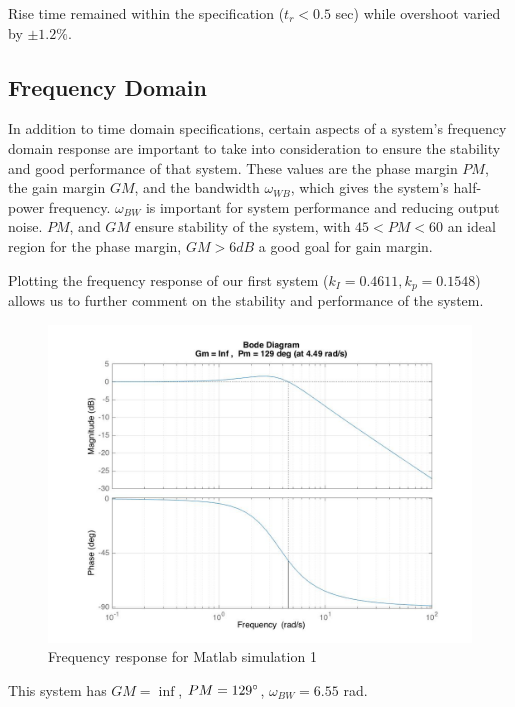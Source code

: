 \documentclass[11pt,titlepage]{article}
\begin{document}
	Rise time remained within the specification ($t_r<0.5$ sec) while overshoot varied by $\pm1.2\%$.
	
    \subsection{Frequency Domain}
    	In addition to time domain specifications, certain aspects of a system's frequency domain response are important to take into consideration to ensure the stability and good performance of that system. These values are the phase margin $PM$, the gain margin $GM$, and the bandwidth $\omega_{WB}$, which gives the system's half-power frequency. $\omega_{BW}$ is important for system performance and reducing output noise. $PM$, and $GM$ ensure stability of the system, with $45<PM<60$ an ideal region for the phase margin, $GM>6dB$ a good goal for gain margin. 
	
	Plotting the frequency response of our first system ($k_I=0.4611, k_p=0.1548$) allows us to further comment on the stability and performance of the system. 
	\begin{figure}[H]
        \centering
        \includegraphics[scale=.3]{Hyr_freq1_bode}
        \caption{Frequency response for Matlab simulation 1}
        \label{fig:Hyr_freq1_bode}
    \end{figure} 
    This system has $GM=\inf$, $PM=129\degree$, $\omega_{BW}=6.55$ rad. 
    
\end{document}
